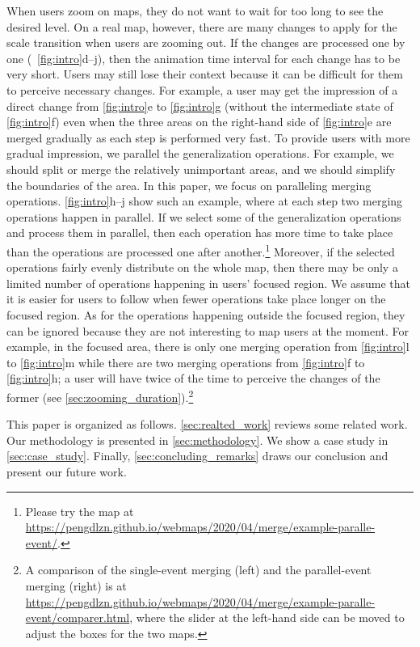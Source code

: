 \documentclass[ijgi,article,submit,moreauthors,pdftex]{Definitions/mdpi}
\begin{document}
When users zoom on maps, 
they do not want to wait for too long to see the desired level.
On a real map, however, 
there are many changes to apply for the scale transition 
when users are zooming out.
If the changes are processed one by one 
(\eg~\figs\ref{fig:intro}d--j),
then the animation time interval for each change has to be very short.
Users may still lose their context 
because it can be difficult for them to perceive necessary changes.
For example, a user may get the impression of
a direct change from \fig\ref{fig:intro}e to \fig\ref{fig:intro}g
(without the intermediate state of \fig\ref{fig:intro}f)
even when the three areas on the right-hand side of \fig\ref{fig:intro}e
are merged gradually as each step is performed very fast.
To provide users with more gradual impression, 
we parallel the generalization operations.
For example, we should split or merge the relatively unimportant areas,
and we should simplify the boundaries of the area.
In this paper, we focus on paralleling merging operations.
\figs\ref{fig:intro}h--j show such an example,
where at each step two merging operations happen in parallel.
If we select some of the generalization operations
and process them in parallel,
then each operation has more time to take place 
than the operations are processed one after another.\footnote{%
Please try the map at
\url{https://pengdlzn.github.io/webmaps/2020/04/merge/example-paralle-event/}.}
Moreover, if the selected operations
fairly evenly distribute on the whole map, 
then there may be only a limited number of operations 
happening in users' focused region.
We assume that it is easier for users to follow 
when fewer operations take place longer on the focused region.
As for the operations happening outside the focused region,
they can be ignored because 
they are not interesting to map users at the moment.
For example, in the focused area, there is only one merging operation 
from \fig\ref{fig:intro}l to \fig\ref{fig:intro}m
while there are two merging operations  
from \fig\ref{fig:intro}f to \fig\ref{fig:intro}h;
a user will have twice of the time to perceive the changes of the former
(see \sect\ref{sec:zooming_duration}).\footnote{%
A comparison of the single-event merging (left) and the parallel-event merging (right) is at
\url{https://pengdlzn.github.io/webmaps/2020/04/merge/example-paralle-event/comparer.html}, 
where the slider at the left-hand side can be moved to adjust the boxes for the two maps.}

This paper is organized as follows.
\sect\ref{sec:realted_work} reviews some related work.
Our methodology is presented in \sect\ref{sec:methodology}.
We show a case study in \sect\ref{sec:case_study}.
Finally, \sect\ref{sec:concluding_remarks} draws our conclusion
and present our future work.
\end{document}
